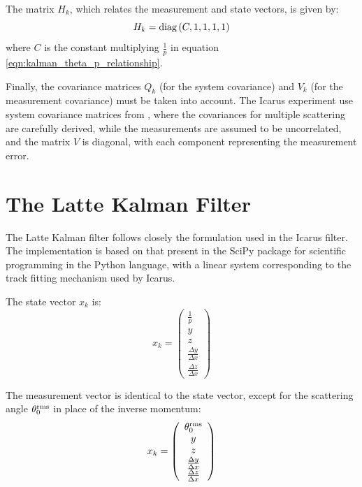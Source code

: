 The matrix $H_k$, which relates the measurement and state vectors, is given by:
\begin{equation}\label{eqn:kalman_measurement_matrix}
    H_k = \mathrm{diag} \left( C, 1, 1, 1, 1 \right)
\end{equation}
where $C$ is the constant multiplying $\displaystyle \frac{1}{p}$ in equation \eqref{eqn:kalman_theta_p_relationship}.

Finally, the covariance matrices $Q_k$ (for the system covariance) and $V_k$ (for the measurement covariance) must be taken into account. The Icarus experiment use system covariance matrices from \citep{Wolin1993}, where the covariances for multiple scattering are carefully derived, while the measurements are assumed to be uncorrelated, and the matrix $V$ is diagonal, with each component representing the measurement error.

\section{The Latte Kalman Filter}
The Latte Kalman filter follows closely the formulation used in the Icarus filter. The implementation is based on that present in the SciPy\citep{SciPy} package for scientific programming in the Python language, with a linear system corresponding to the track fitting mechanism used by Icarus.

The state vector $x_k$ is:
\begin{equation}\label{eqn:kalman_latte_state_vector}
    x_k = \left(\begin{array}{c}
        \frac{1}{p} \\ y \\ z \\ \frac{\Delta y}{\Delta x} \\ \frac{\Delta z}{\Delta x}
    \end{array}\right)
\end{equation}

The measurement vector is identical to the state vector, except for the scattering angle $\theta_0^{\mathrm{rms}}$ in place of the inverse momentum:
\begin{equation}\label{eqn:kalman_latte_measurement_vector}
    x_k = \left(\begin{array}{c}
        \theta_0^{\mathrm{rms}} \\ y \\ z \\ \frac{\Delta y}{\Delta x} \\ \frac{\Delta z}{\Delta x}
    \end{array}\right)
\end{equation}


